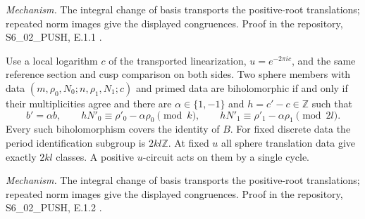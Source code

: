 \noindent\textit{Mechanism.} The integral change of basis transports the positive-root translations; repeated norm images give the displayed congruences. Proof in the repository, S6\_02\_PUSH, E.1.1 \cite[run S6\_02\_PUSH, E.1.1]{Repo}.
\begin{announcement}[PUSH E.1.2; A]\label{push:E.1.2}
Use a local logarithm $c$ of the transported linearization,
$u=e^{-2\pi i c}$, and the same reference section and cusp comparison
on both sides.  Two sphere members with data
$(m,\rho_0,N_0;n,\rho_1,N_1;c)$ and primed data are biholomorphic
if and only if their multiplicities agree and there are
$\alpha\in\{1,-1\}$ and $h=c'-c\in\mathbb Z$ such that
\[
 b'=\alpha b,\qquad
 hN'_0\equiv\rho'_0-\alpha\rho_0\pmod{k},\qquad
 hN'_1\equiv\rho'_1-\alpha\rho_1\pmod{2l}.
\]
Every such biholomorphism covers the identity of $B$.
For fixed discrete data the period identification subgroup is
$2kl\mathbb Z$.  At fixed $u$ all sphere translation data give
exactly $2kl$ classes.  A positive $u$-circuit acts on them by a
single cycle.
\end{announcement}
\noindent\textit{Mechanism.} The integral change of basis transports the positive-root translations; repeated norm images give the displayed congruences. Proof in the repository, S6\_02\_PUSH, E.1.2 \cite[run S6\_02\_PUSH, E.1.2]{Repo}.
